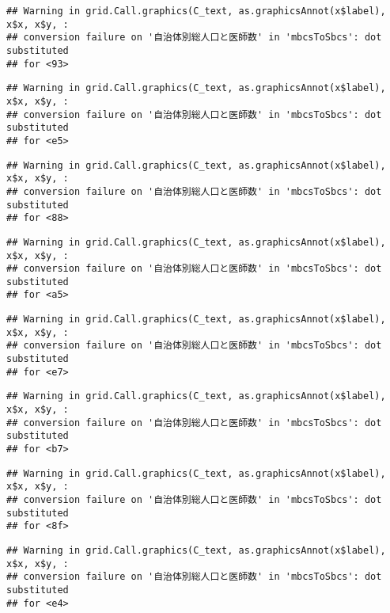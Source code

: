 \documentclass[
]{article}
\begin{document}
\begin{verbatim}
## Warning in grid.Call.graphics(C_text, as.graphicsAnnot(x$label), x$x, x$y, :
## conversion failure on '自治体別総人口と医師数' in 'mbcsToSbcs': dot substituted
## for <93>
\end{verbatim}

\begin{verbatim}
## Warning in grid.Call.graphics(C_text, as.graphicsAnnot(x$label), x$x, x$y, :
## conversion failure on '自治体別総人口と医師数' in 'mbcsToSbcs': dot substituted
## for <e5>
\end{verbatim}

\begin{verbatim}
## Warning in grid.Call.graphics(C_text, as.graphicsAnnot(x$label), x$x, x$y, :
## conversion failure on '自治体別総人口と医師数' in 'mbcsToSbcs': dot substituted
## for <88>
\end{verbatim}

\begin{verbatim}
## Warning in grid.Call.graphics(C_text, as.graphicsAnnot(x$label), x$x, x$y, :
## conversion failure on '自治体別総人口と医師数' in 'mbcsToSbcs': dot substituted
## for <a5>
\end{verbatim}

\begin{verbatim}
## Warning in grid.Call.graphics(C_text, as.graphicsAnnot(x$label), x$x, x$y, :
## conversion failure on '自治体別総人口と医師数' in 'mbcsToSbcs': dot substituted
## for <e7>
\end{verbatim}

\begin{verbatim}
## Warning in grid.Call.graphics(C_text, as.graphicsAnnot(x$label), x$x, x$y, :
## conversion failure on '自治体別総人口と医師数' in 'mbcsToSbcs': dot substituted
## for <b7>
\end{verbatim}

\begin{verbatim}
## Warning in grid.Call.graphics(C_text, as.graphicsAnnot(x$label), x$x, x$y, :
## conversion failure on '自治体別総人口と医師数' in 'mbcsToSbcs': dot substituted
## for <8f>
\end{verbatim}

\begin{verbatim}
## Warning in grid.Call.graphics(C_text, as.graphicsAnnot(x$label), x$x, x$y, :
## conversion failure on '自治体別総人口と医師数' in 'mbcsToSbcs': dot substituted
## for <e4>
\end{verbatim}
\end{document}
